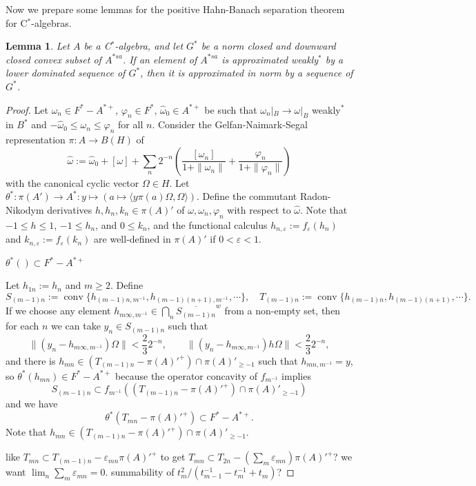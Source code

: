 \documentclass[a4paper]{amsart}
\newcommand{\e}{\varepsilon}
\theoremstyle{plain}
\newtheorem{lem}[thm]{Lemma}
\theoremstyle{definition}
\begin{document}
Now we prepare some lemmas for the positive Hahn-Banach separation theorem for C$^*$-algebras.


\begin{lem}\label{lower dominated sequence}
Let $A$ be a C$^*$-algebra, and let $G^*$ be a norm closed and downward closed convex subset of $A^{*sa}$.
If an element of $A^{*sa}$ is approximated weakly$^*$ by a lower dominated sequence of $G^*$, then it is approximated in norm by a sequence of $G^*$.
\end{lem}
\begin{proof}
Let $\omega_n\in F^*-A^{*+}$, $\varphi_n\in F^*$, $\widehat\omega_0\in A^{*+}$ be such that $\omega_n|_B\to\omega|_B$ weakly$^*$ in $B^*$ and $-\widehat\omega_0\le\omega_n\le\varphi_n$ for all $n$.
Consider the Gelfan-Naimark-Segal representation $\pi:A\to B(H)$ of
\[\widehat\omega:=\widehat\omega_0+[\omega]+\sum_n2^{-n}\left(\frac{[\omega_n]}{1+\|\omega_n\|}+\frac{\varphi_n}{1+\|\varphi_n\|}\right)\]
with the canonical cyclic vector $\Omega\in H$.
Let $\theta^*:\pi(A')\to A^*:y\mapsto(a\mapsto\langle y\pi(a)\Omega,\Omega\rangle)$.
Define the commutant Radon-Nikodym derivatives $h,h_n,k_n\in\pi(A)'$ of $\omega,\omega_n,\varphi_n$ with respect to $\widehat\omega$.
Note that $-1\le h\le1$, $-1\le h_n$, and $0\le k_n$, and the functional calculus $h_{n,\e}:=f_\e(h_n)$ and $k_{n,\e}:=f_\e(k_n)$ are well-defined in $\pi(A)'$ if $0<\e<1$.

\newpage

$\theta^*()\subset F^*-A^{*+}$

Let $h_{1n}:=h_n$ and $m\ge2$.
Define
\[S_{(m-1)n}:=\operatorname{conv}\{h_{(m-1)n,m^{-1}},h_{(m-1)(n+1),m^{-1}},\cdots\},\quad T_{(m-1)n}:=\operatorname{conv}\{h_{(m-1)n},h_{(m-1)(n+1)},\cdots\}.\]
If we choose any element $h_{m\infty,m^{-1}}\in\bigcap_n\overline{S_{(m-1)n}}^w$ from a non-empty set, then for each $n$ we can take $y_n\in S_{(m-1)n}$ such that
\[\|(y_n-h_{m\infty,m^{-1}})\Omega\|<\frac232^{-n},\qquad\|(y_n-h_{m\infty,m^{-1}})h\Omega\|<\frac232^{-n},\]
and there is $h_{mn}\in(T_{(m-1)n}-\pi(A)'^+)\cap\pi(A)'_{\ge-1}$ such that $h_{mn,m^{-1}}=y$, so $\theta^*(h_{mn})\in F^*-A^{*+}$ because the operator concavity of $f_{m^{-1}}$ implies
\[S_{(m-1)n}\subset f_{m^{-1}}((T_{(m-1)n}-\pi(A)'^+)\cap\pi(A)'_{\ge-1})\]
and we have
\[\theta^*(T_{mn}-\pi(A)'^+)\subset F^*-A^{*+}.\]
Note that $h_{mn}\in(T_{(m-1)n}-\pi(A)'^+)\cap\pi(A)'_{\ge-1}$.

like $T_{mn}\subset T_{(m-1)n}-\e_{mn}\pi(A)'^+$ to get $T_{mn}\subset T_{2n}-(\sum_m\e_{mn})\pi(A)'^+$?
we want $\lim_n\sum_m\e_{mn}=0$.
summability of $t_m^2/(t_{m-1}^{-1}-t_m^{-1}+t_m)$?


\end{proof}
\end{document}
